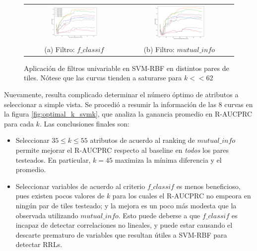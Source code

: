 \begin{figure}[h!]
\begin{tabular}{cc}
  \includegraphics[width=0.49\textwidth]{Kap5/rbf_f_classif_ALL_CURVES.png} &   \includegraphics[width=0.49\textwidth]{Kap5/rbf_mutual_info_classif_ALL_CURVES.png} \\
(a) Filtro: $f\_classif$ & (b) Filtro: $mutual\_info$
\end{tabular}
\caption{Aplicación de filtros univariable en SVM-RBF en distintos pares de tiles. Nótese que las curvas tienden a saturarse para $k << 62$}
\label{fig:svmk_univariate_unified}
\end{figure}

Nuevamente, resulta complicado determinar el número óptimo de atributos a seleccionar a simple vista. Se procedió a resumir la información de las 8 curvas en la figura \ref{fig:optimal_k_svmk}, que analiza la ganancia promedio en R-AUCPRC para cada $k$. Las conclusiones finales son:

\begin{itemize}
\item Seleccionar $35 \leq k \leq 55$ atributos de acuerdo al ranking de $mutual\_info$ permite mejorar el R-AUCPRC respecto al baseline en \textit{todos} los pares testeados. En particular, $k=45$ maximiza la mínima diferencia y el promedio.
\item Seleccionar variables de acuerdo al criterio $f\_classif$ es menos beneficioso, pues existen pocos valores de $k$ para los cuales el R-AUCPRC no empeora en ningún par de tiles testeado; y la mejora es un poco más modesta que la observada utilizando $mutual\_info$. Esto puede deberse a que $f\_classif$ es incapaz de detectar correlaciones no lineales, y puede estar causando el descarte prematuro de variables que resultan útiles a SVM-RBF para detectar RRLs.
\end{itemize}

